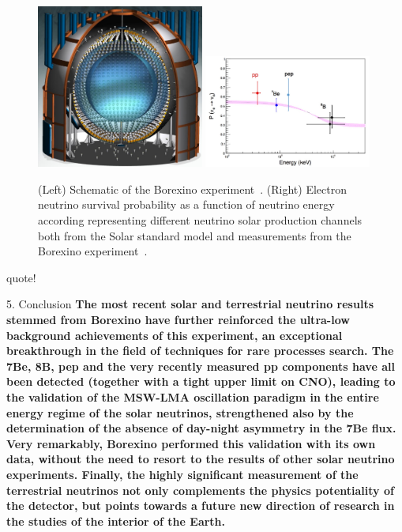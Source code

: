 \begin{figure}[h!]
\centering
  \centering
\includegraphics[width=0.49\textwidth]{figures/borexino.jpeg}
\includegraphics[width=0.49\textwidth]{figures/borexino3.jpeg}
\vspace{2mm}
\caption{(Left) Schematic of the Borexino experiment~\cite{63Borexino}. (Right) Electron neutrino survival probability as a function of neutrino energy according representing different neutrino solar production channels both from the Solar standard model and measurements from the Borexino experiment~\cite{63Borexino}.}
\label{fig:borexino}
\end{figure}

quote!

5. Conclusion
\textbf{The most recent solar and terrestrial neutrino results stemmed from Borexino have further reinforced the ultra-low background achievements of this experiment, an exceptional breakthrough in the field of techniques for rare processes search. The 7Be, 8B, pep and the very recently measured pp components have all been detected (together with a tight upper limit on CNO), leading to the validation of the MSW-LMA oscillation paradigm in the entire energy regime of the solar neutrinos, strengthened also by the determination of the absence of day-night asymmetry in the 7Be flux. Very remarkably, Borexino performed this validation with its own data, without the need to resort to the results of other solar neutrino experiments.
Finally, the highly significant measurement of the terrestrial neutrinos not only complements the physics potentiality of the detector, but points towards a future new direction of research in the studies of the interior of the Earth.}

